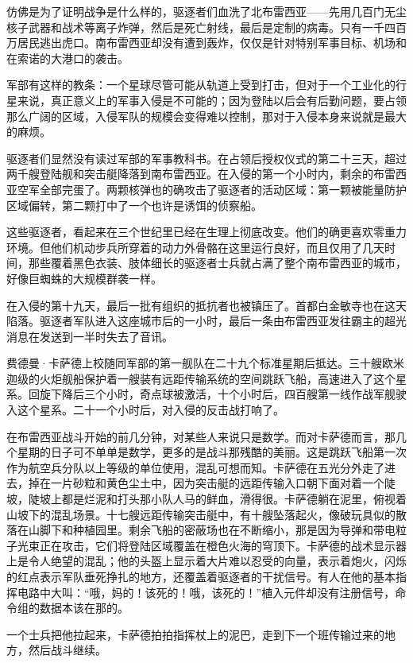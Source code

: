 \documentclass[AutoFakeBold=true]{book}
\begin{document}
仿佛是为了证明战争是什么样的，驱逐者们血洗了北布雷西亚——先用几百门无尘核子武器和战术等离子炸弹，然后是死亡射线，最后是定制的病毒。只有一千四百万居民逃出虎口。南布雷西亚却没有遭到轰炸，仅仅是针对特别军事目标、机场和在索诺的大港口的袭击。

军部有这样的教条：一个星球尽管可能从轨道上受到打击，但对于一个工业化的行星来说，真正意义上的军事入侵是不可能的；因为登陆以后会有后勤问题，要占领那么广阔的区域，入侵军队的规模会变得难以控制，那对于入侵本身来说就是最大的麻烦。

驱逐者们显然没有读过军部的军事教科书。在占领后授权仪式的第二十三天，超过两千艘登陆舰和突击艇降落到南布雷西亚。在入侵的第一个小时内，剩余的布雷西亚空军全部完蛋了。两颗核弹也的确攻击了驱逐者的活动区域：第一颗被能量防护区域偏转，第二颗打中了一个也许是诱饵的侦察船。

这些驱逐者，看起来在三个世纪里已经在生理上彻底改变。他们的确更喜欢零重力环境。但他们机动步兵所穿着的动力外骨骼在这里运行良好，而且仅用了几天时间，那些覆着黑色衣装、肢体细长的驱逐者士兵就占满了整个南布雷西亚的城市，好像巨蜘蛛的大规模群袭一样。

在入侵的第十九天，最后一批有组织的抵抗者也被镇压了。首都白金敏寺也在这天陷落。驱逐者军队进入这座城市后的一小时，最后一条由布雷西亚发往霸主的超光消息在发送到一半时失去了音讯。

费德曼·卡萨德上校随同军部的第一舰队在二十九个标准星期后抵达。三十艘欧米迦级的火炬舰船保护着一艘装有远距传输系统的空间跳跃飞船，高速进入了这个星系。回旋下降后三个小时，奇点球被激活，十个小时后，四百艘第一线作战军舰驶入这个星系。二十一个小时后，对入侵的反击战打响了。

在布雷西亚战斗开始的前几分钟，对某些人来说只是数学。而对卡萨德而言，那几个星期的日子可不单单是数学，更多的是战斗那残酷的美丽。这是跳跃飞船第一次作为航空兵分队以上等级的单位使用，混乱可想而知。卡萨德在五光分外走了进去，掉在一片砂粒和黄色尘土中，因为突击艇的远距传输入口朝下面对着一个陡坡，陡坡上都是烂泥和打头那小队人马的鲜血，滑得很。卡萨德躺在泥里，俯视着山坡下的混乱场景。十七艘远距传输突击艇中，有十艘坠落起火，像破玩具似的散落在山脚下和种植园里。剩余飞船的密蔽场也在不断缩小，那是因为导弹和带电粒子光束正在攻击，它们将登陆区域覆盖在橙色火海的穹顶下。卡萨德的战术显示器上是令人绝望的混乱；他的头盔上显示着大片难以忍受的向量，表示着炮火，闪烁的红点表示军队垂死挣扎的地方，还覆盖着驱逐者的干扰信号。有人在他的基本指挥电路中大叫：``哦，妈的！该死的！哦，该死的！''植入元件却没有注册信号，命令组的数据本该在那的。

一个士兵把他拉起来，卡萨德拍拍指挥杖上的泥巴，走到下一个班传输过来的地方，然后战斗继续。
\end{document}
